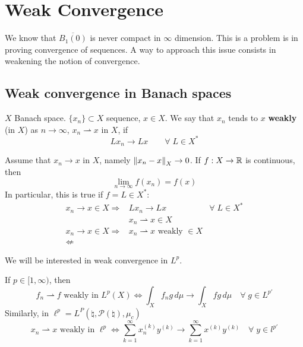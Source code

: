 \newpage
\section{Weak Convergence}
We know that \(\overline{B_1(0)}\) is never compact in \(\infty\) dimension. This is a problem is in proving convergence of sequences. A way to approach this issue consists in weakening the notion of convergence.
\subsection{Weak convergence in Banach spaces}
\begin{definition}
    \(X\) Banach space. \(\{x_n\} \subset X\) sequence, \(x \in X\). We say that \(x_n\) tends to \(x\) \textbf{weakly} (in \(X\)) as \(n \to \infty\), \(x_n \rightharpoonup x\) in \(X\), if 
    \[
        L x_n \to Lx \qquad \forall \; L \in X^*
    \]
\end{definition}
\begin{remark}
    Assume that \(x_n \to x\) in \(X\), namely \(\norm{x_n -x}_X \to 0\). If \(f:X \to \mathbb{R}\) is continuous, then
    \[
        \lim_{n \to \infty} f(x_n) = f(x)
    \]
    In particular, this is true if \(f = L \in X^*\):
    \[
        \begin{array}{rlc}
            x_n \to x \in X \Rightarrow & L x_n \to Lx & \forall\; L \in X^* \\
            & x_n \rightharpoonup x \in X & \\
            x_n \to x \in X \Rightarrow & x_n \rightharpoonup x \text{ weakly } \in X & \\
             \nLeftarrow & 
        \end{array}
    \]
\end{remark}
\begin{remark}
    We will be interested in weak convergence in \(L^p\). 
    
    \noindent If \(p \in [1, \infty)\), then 
    \[
        f_n \rightharpoonup f \text{ weakly in } L^p(X) \Leftrightarrow \int_X f_n g \, d\mu \to \int_X fg \, d\mu \quad \forall \; g \in L^{p'}
    \]
    \noindent Similarly, in \(\ell^p = L^P(\natural, \mathcal{P}(\natural), \mu_c)\)
    \[
        x_n \rightharpoonup x \text{ weakly in } \ell^p \Leftrightarrow \sum_{k=1}^\infty x_n^{(k)} y^{(k)} \to \sum_{k=1}^\infty x^{(k)} y^{(k)} \quad \forall \; y \in l^{p'}
    \]
\end{remark}

